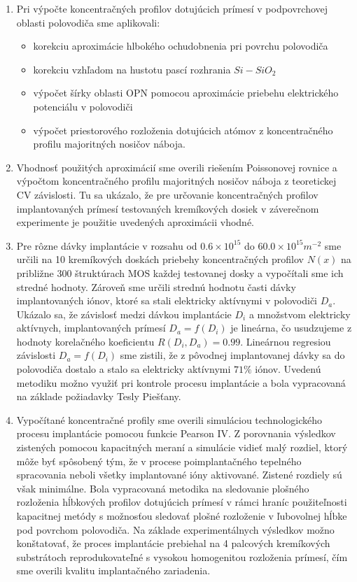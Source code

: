 \begin{enumerate}
\item Pri výpočte koncentračných profilov dotujúcich prímesí v
  podpovrchovej oblasti polovodiča sme aplikovali:

  \begin{itemize}
  \item korekciu aproximácie hlbokého ochudobnenia pri povrchu
    polovodiča
  \item korekciu vzhľadom na hustotu pascí rozhrania $Si-SiO_{2}$
  \item výpočet šírky oblasti OPN pomocou aproximácie priebehu
    elektrického potenciálu v polovodiči
  \item výpočet priestorového rozloženia dotujúcich atómov z
    koncentračného profilu majoritných nosičov náboja.
  \end{itemize}

\item Vhodnosť použitých aproximácií sme overili riešením Poissonovej
  rovnice a výpočtom koncentračného profilu majoritných nosičov náboja
  z teoretickej CV závislosti. Tu sa ukázalo, že pre určovanie
  koncentračných profilov implantovaných prímesí testovaných
  kremíkových dosiek v záverečnom experimente je použitie uvedených
  aproximácii vhodné.

\item Pre rôzne dávky implantácie v rozsahu od $0.6 \times 10^{15}$ do
  $60.0 \times 10^{15} m^{-2}$ sme určili na 10 kremíkových doskách
  priebehy koncentračných profilov $N(x)$ na približne 300 štruktúrach
  MOS každej testovanej dosky a vypočítali sme ich stredné
  hodnoty. Zároveň sme určili strednú hodnotu časti dávky
  implantovaných iónov, ktoré sa stali elektricky aktívnymi v
  polovodiči $D_{a}$. Ukázalo sa, že závislosť medzi dávkou
  implantácie $D_{i}$ a množstvom elektricky aktívnych, implantovaných
  prímesí $D_{a}=f(D_{i})$ je lineárna, čo usudzujeme z hodnoty
  korelačného koeficientu $R(D_{i},D_{a})=0.99$.  Lineárnou regresiou
  závislosti $D_{a}=f(D_{i})$ sme zistili, že z pôvodnej implantovanej
  dávky sa do polovodiča dostalo a stalo sa elektricky aktívnymi
  $71\%$ iónov. Uvedenú metodiku možno využiť pri kontrole procesu
  implantácie a bola vypracovaná na základe požiadavky Tesly Piešťany.

\item Vypočítané koncentračné profily sme overili simuláciou
  technologického procesu implantácie pomocou funkcie Pearson IV\@. Z
  porovnania výsledkov zistených pomocou kapacitných meraní a
  simulácie vidieť malý rozdiel, ktorý môže byť spôsobený tým, že v
  procese poimplantačného tepelného spracovania neboli všetky
  implantované ióny aktivované. Zistené rozdiely sú však
  minimálne. Bola vypracovaná metodika na sledovanie plošného
  rozloženia hĺbkových profilov dotujúcich prímesí v rámci hraníc
  použiteľnosti kapacitnej metódy s možnosťou sledovať plošné
  rozloženie v ľubovolnej hĺbke pod povrchom polovodiča. Na základe
  experimentálnych výsledkov možno konštatovať, že proces implantácie
  prebiehal na 4 palcových kremíkových substrátoch reprodukovateľné s
  vysokou homogenitou rozloženia prímesí, čím sme overili kvalitu
  implantačného zariadenia.


\end{enumerate}
